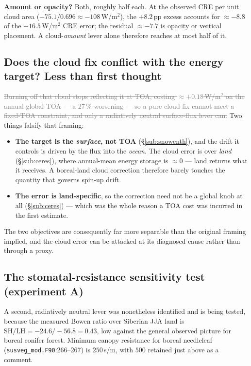 \documentclass[10pt]{article}
\newcommand{\dead}[1]{\textcolor{gray}{\sout{#1}}}
\begin{document}
\textbf{Amount or opacity?} Both, roughly half each. At the observed CRE per unit cloud area
($-75.1/0.696\approx-108$\,W/m$^2$), the $+8.2$\,pp excess accounts for $\approx-8.8$ of the $-16.5$\,W/m$^2$
CRE error; the residual $\approx-7.7$ is opacity or vertical placement. A cloud-\emph{amount} lever alone
therefore reaches at most half of it.

\subsection{Does the cloud fix conflict with the energy target? Less than first thought}\label{sub:jjaknob}
\dead{Burning off that cloud stops reflecting it at TOA, costing $\approx+0.18$\,W/m$^2$ on the annual global
TOA --- a $27\,\%$ worsening --- so a pure cloud fix cannot meet a fixed-TOA constraint, and only a
radiatively neutral surface-flux lever can.} Two things falsify that framing:

\begin{itemize}\itemsep1pt
\item \textbf{The target is the \emph{surface}, not TOA} (\S\ref{sub:snowenth}), and the drift it controls is
driven by the flux into the \emph{ocean}. The cloud error is over \emph{land}
(\S\ref{sub:ceres}), where annual-mean energy storage is $\approx0$ --- land returns what it receives. A
boreal-land cloud correction therefore barely touches the quantity that governs spin-up drift.
\item \textbf{The error is land-specific}, so the correction need not be a global knob at all
(\S\ref{sub:ceres}) --- which was the whole reason a TOA cost was incurred in the first estimate.
\end{itemize}
The two objectives are consequently far more separable than the original framing implied, and the cloud
error can be attacked at its diagnosed cause rather than through a proxy.

\subsection{The stomatal-resistance sensitivity test (experiment A)}\label{sub:expA}
A second, radiatively neutral lever was nonetheless identified and is being tested, because the measured
Bowen ratio over Siberian JJA land is $\mathrm{SH/LH}=-24.6/-56.8=\mathbf{0.43}$, low against the general
observed picture for boreal conifer forest. Minimum canopy resistance for boreal needleleaf
(\texttt{susveg\_mod.F90}:266--267) is $250$\,s/m, with $500$ retained just above as a comment.
\end{document}
